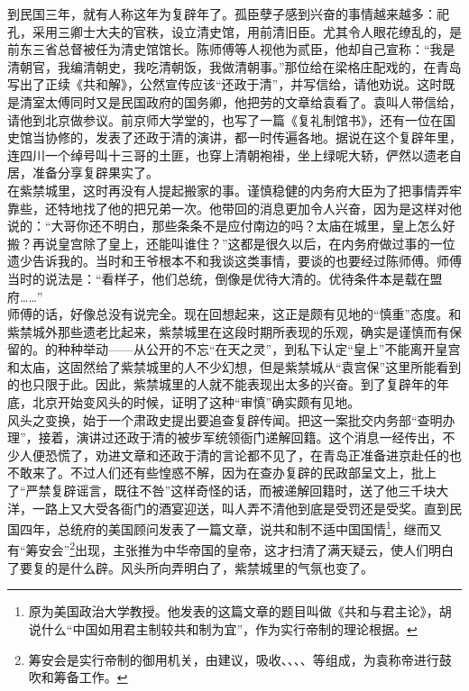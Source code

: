 到民国三年，就有人称这年为复辟年了。孤臣孽子感到兴奋的事情越来越多：祀孔，采用三卿士大夫的官秩，设立清史馆，用前清旧臣。尤其令人眼花缭乱的，是前东三省总督被任为清史馆馆长。陈师傅等人视他为贰臣，他却自己宣称：“我是清朝官，我编清朝史，我吃清朝饭，我做清朝事。”那位给在梁格庄配戏的，在青岛写出了正续《共和解》，公然宣传应该“还政于清”，并写信给，请他劝说。这时既是清室太傅同时又是民国政府的国务卿，他把劳的文章给袁看了。袁叫人带信给，请他到北京做参议。前京师大学堂的，也写了一篇《复礼制馆书》，还有一位在国史馆当协修的，发表了还政于清的演讲，都一时传遍各地。据说在这个复辟年里，连四川一个绰号叫十三哥的土匪，也穿上清朝袍褂，坐上绿呢大轿，俨然以遗老自居，准备分享复辟果实了。\\

在紫禁城里，这时再没有人提起搬家的事。谨慎稳健的内务府大臣为了把事情弄牢靠些，还特地找了他的把兄弟一次。他带回的消息更加令人兴奋，因为是这样对他说的：“大哥你还不明白，那些条条不是应付南边的吗？太庙在城里，皇上怎么好搬？再说皇宫除了皇上，还能叫谁住？”这都是很久以后，在内务府做过事的一位遗少告诉我的。当时和王爷根本不和我谈这类事情，要谈的也要经过陈师傅。师傅当时的说法是：“看样子，他们总统，倒像是优待大清的。优待条件本是载在盟府……”\\

师傅的话，好像总没有说完全。现在回想起来，这正是颇有见地的“慎重”态度。和紫禁城外那些遗老比起来，紫禁城里在这段时期所表现的乐观，确实是谨慎而有保留的。的种种举动——从公开的不忘“在天之灵”，到私下认定“皇上”不能离开皇宫和太庙，这固然给了紫禁城里的人不少幻想，但是紫禁城从“袁宫保”这里所能看到的也只限于此。因此，紫禁城里的人就不能表现出太多的兴奋。到了复辟年的年底，北京开始变风头的时候，证明了这种“审慎”确实颇有见地。\\

风头之变换，始于一个肃政史提出要追查复辟传闻。把这一案批交内务部“查明办理”，接着，演讲过还政于清的被步军统领衙门递解回籍。这个消息一经传出，不少人便恐慌了，劝进文章和还政于清的言论都不见了，在青岛正准备进京赴任的也不敢来了。不过人们还有些惶惑不解，因为在查办复辟的民政部呈文上，批上了“严禁复辟谣言，既往不咎”这样奇怪的话，而被递解回籍时，送了他三千块大洋，一路上又大受各衙门的酒宴迎送，叫人弄不清他到底是受罚还是受奖。直到民国四年，总统府的美国顾问发表了一篇文章，说共和制不适中国国情\footnote{原为美国政治大学教授。他发表的这篇文章的题目叫做《共和与君主论》，胡说什么“中国如用君主制较共和制为宜”，作为实行帝制的理论根据。}，继而又有“筹安会”\footnote{筹安会是实行帝制的御用机关，由建议，吸收、、、、等组成，为袁称帝进行鼓吹和筹备工作。}出现，主张推为中华帝国的皇帝，这才扫清了满天疑云，使人们明白了要复的是什么辟。风头所向弄明白了，紫禁城里的气氛也变了。\\

